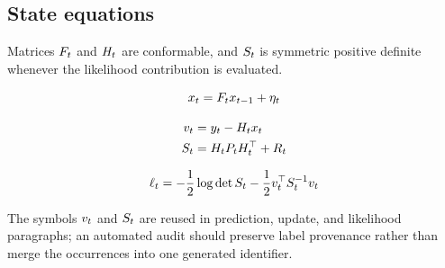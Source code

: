 \subsection{State equations}

\begin{assumption}
\label{assump:macro-filter-dimensions}
Matrices $F_t$ and $H_t$ are conformable, and $S_t$ is symmetric positive
definite whenever the likelihood contribution is evaluated.
\end{assumption}

\begin{equation}
\label{eq:macro-filter-transition}
x_t = F_t x_{t-1} + \eta_t
\end{equation}

\begin{align}
\label{eq:macro-filter-innovation}
v_t &= y_t - H_t x_t \\
S_t &= H_t P_t H_t^\top + R_t
\end{align}

\begin{equation}
\label{eq:macro-filter-likelihood}
\ell_t = -\frac{1}{2}\log\det S_t - \frac{1}{2}v_t^\top S_t^{-1}v_t
\end{equation}

\begin{proposition}
\label{prop:macro-filter-repeat-notation}
The symbols $v_t$ and $S_t$ are reused in prediction, update, and likelihood
paragraphs; an automated audit should preserve label provenance rather than merge
the occurrences into one generated identifier.
\end{proposition}
